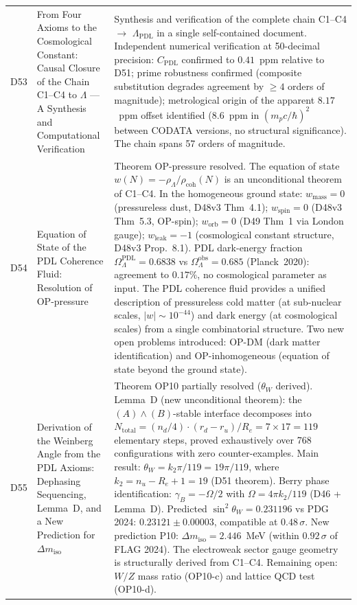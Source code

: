 \documentclass[11pt,a4paper]{article}
\theoremstyle{plain}
\theoremstyle{definition}
\theoremstyle{remark}
\newcommand{\rhocoh}{\rho_{\mathrm{coh}}}
\begin{document}
\begin{longtable}{L{1.3cm}L{3.8cm}L{8.0cm}}
D53 & From Four Axioms to the Cosmological Constant: Causal Closure of the Chain C1--C4 to $\Lambda$ --- A Synthesis and Computational Verification~\cite{D53} & \textcolor{proofblue}{Synthesis and verification} of the complete chain C1--C4 $\to$ $\Lambda_{\mathrm{PDL}}$ in a single self-contained document. Independent numerical verification at 50-decimal precision: $C_{\mathrm{PDL}}$ confirmed to $0.41$~ppm relative to D51; prime robustness confirmed (composite substitution degrades agreement by $\geq 4$ orders of magnitude); metrological origin of the apparent $8.17$~ppm offset identified ($8.6$~ppm in $(m_p c/\hbar)^2$ between CODATA versions, no structural significance). The chain spans 57 orders of magnitude.\\[0.4em]
D54 & Equation of State of the PDL Coherence Fluid: Resolution of OP-pressure~\cite{D54} & \textcolor{proofblue}{Theorem} OP-pressure resolved. The equation of state $w(N) = -\rho_\Lambda/\rhocoh(N)$ is an unconditional theorem of C1--C4. In the homogeneous ground state: $w_{\mathrm{mass}} = 0$ (pressureless dust, D48v3 Thm~4.1); $w_{\mathrm{spin}} = 0$ (D48v3 Thm~5.3, OP-spin); $w_{\mathrm{orb}} = 0$ (D49 Thm~1 via London gauge); $w_{\mathrm{leak}} = -1$ (cosmological constant structure, D48v3 Prop.~8.1). PDL dark-energy fraction $\Omega_\Lambda^{\mathrm{PDL}} = 0.6838$ vs $\Omega_\Lambda^{\mathrm{obs}} = 0.685$ (Planck~2020): agreement to $0.17\%$, no cosmological parameter as input. The PDL coherence fluid provides a unified description of pressureless cold matter (at sub-nuclear scales, $|w|\sim 10^{-44}$) and dark energy (at cosmological scales) from a single combinatorial structure. Two new open problems introduced: OP-DM (dark matter identification) and OP-inhomogeneous (equation of state beyond the ground state).\\[0.4em]
D55 & Derivation of the Weinberg Angle from the PDL Axioms: Dephasing Sequencing, Lemma~D, and a New Prediction for $\Delta m_{\mathrm{iso}}$~\cite{D55} & \textcolor{proofblue}{Theorem} OP10 partially resolved ($\theta_W$ derived). Lemma~D (new unconditional theorem): the $(A)\wedge(B)$-stable interface decomposes into $N_{\mathrm{total}} = (n_d/4)\cdot(r_d-r_u)/R_e = 7\times 17 = 119$ elementary steps, proved exhaustively over 768 configurations with zero counter-examples. Main result: $\theta_W = k_2\pi/119 = 19\pi/119$, where $k_2 = n_u - R_e + 1 = 19$ (D51 theorem). Berry phase identification: $\gamma_B = -\Omega/2$ with $\Omega = 4\pi k_2/119$ (D46 + Lemma~D). Predicted $\sin^2\theta_W = 0.231196$ vs PDG 2024: $0.23121 \pm 0.00003$, compatible at $0.48\,\sigma$. New prediction P10: $\Delta m_{\mathrm{iso}} = 2.446$~MeV (within $0.92\,\sigma$ of FLAG 2024). The electroweak sector gauge geometry is structurally derived from C1--C4. Remaining open: $W/Z$ mass ratio (OP10-c) and lattice QCD test (OP10-d).\\[0.4em]

\end{longtable}
\end{document}
